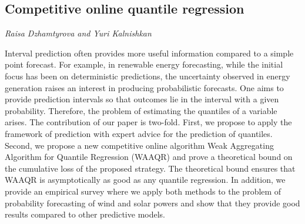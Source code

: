 \documentclass[../booklet.tex]{subfiles}
\begin{document}
\subsection[Competitive online quantile regression. {\it Raisa Dzhamtyrova and Yuri Kalnishkan}]{Competitive online quantile regression}
 

\begin{center}
  {\it Raisa Dzhamtyrova and Yuri Kalnishkan}
\end{center}

\vskip 0.8cm


 Interval prediction often provides more useful information compared to a simple point forecast. For example, in renewable energy forecasting, while the initial focus has been on deterministic predictions, the uncertainty observed in energy generation raises an interest in producing probabilistic forecasts. One aims to provide prediction intervals so that outcomes lie in the interval with a given probability. Therefore, the problem of estimating the quantiles of a variable arises. The contribution of our paper is two-fold. First, we propose to apply the framework of prediction with expert advice for the prediction of quantiles. Second, we propose a new competitive online algorithm Weak Aggregating Algorithm for Quantile Regression (WAAQR) and prove a theoretical bound on the cumulative loss of the proposed strategy. The theoretical bound ensures that WAAQR is asymptotically as good as any quantile regression. In addition, we provide an empirical survey where we apply both methods to the problem of probability forecasting of wind and solar powers and show that they provide good results compared to other predictive models.

\end{document}
